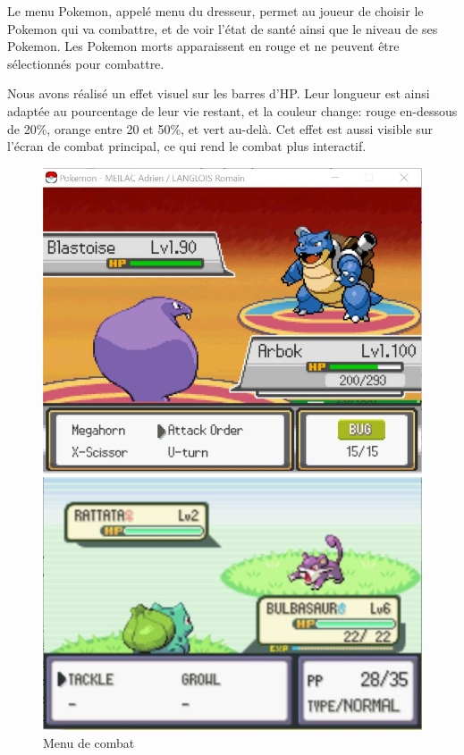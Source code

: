 Le menu Pokemon, appelé menu du dresseur, permet au joueur de choisir le Pokemon qui va combattre, et de voir l'état de santé ainsi que le niveau de ses Pokemon. Les Pokemon morts apparaissent en rouge et ne peuvent être sélectionnés pour combattre. 

Nous avons réalisé un effet visuel sur les barres d'HP. Leur longueur est ainsi adaptée au pourcentage de leur vie restant, et la couleur change: rouge en-dessous de 20\%, orange entre 20 et 50\%, et vert au-delà. Cet effet est aussi visible sur l'écran de combat principal, ce qui rend le combat plus interactif. 

\begin{figure}[!h]
\begin{minipage}{0.49\textwidth}
\includegraphics[scale = 0.6]{../Images/fightMenu.jpg}
\end{minipage}
\begin{minipage}{0.49\textwidth}
\includegraphics[scale = 0.84]{../Images/vrai_jeu_fightMenu.jpg}
\end{minipage}
\caption{Menu de combat}
\end{figure}


